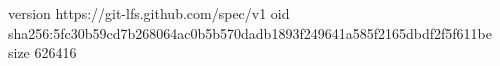 version https://git-lfs.github.com/spec/v1
oid sha256:5fc30b59cd7b268064ac0b5b570dadb1893f249641a585f2165dbdf2f5f611be
size 626416
